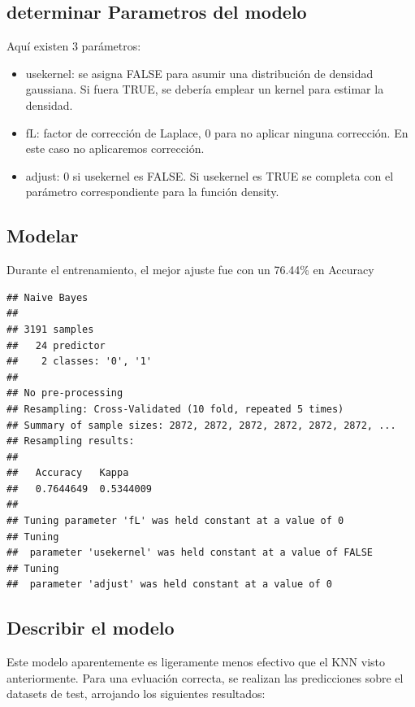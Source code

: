 \documentclass[]{article}
\begin{document}
\hypertarget{determinar-parametros-del-modelo}{%
\subsection{determinar Parametros del
modelo}\label{determinar-parametros-del-modelo}}

Aquí existen 3 parámetros:

\begin{itemize}
\item
  usekernel: se asigna FALSE para asumir una distribución de densidad
  gaussiana. Si fuera TRUE, se debería emplear un kernel para estimar la
  densidad.
\item
  fL: factor de corrección de Laplace, 0 para no aplicar ninguna
  corrección. En este caso no aplicaremos corrección.
\item
  adjust: 0 si usekernel es FALSE. Si usekernel es TRUE se completa con
  el parámetro correspondiente para la función density.
\end{itemize}

\hypertarget{modelar-1}{%
\subsection{Modelar}\label{modelar-1}}

Durante el entrenamiento, el mejor ajuste fue con un 76.44\% en Accuracy

\begin{lstlisting}
## Naive Bayes 
## 
## 3191 samples
##   24 predictor
##    2 classes: '0', '1' 
## 
## No pre-processing
## Resampling: Cross-Validated (10 fold, repeated 5 times) 
## Summary of sample sizes: 2872, 2872, 2872, 2872, 2872, 2872, ... 
## Resampling results:
## 
##   Accuracy   Kappa    
##   0.7644649  0.5344009
## 
## Tuning parameter 'fL' was held constant at a value of 0
## Tuning
##  parameter 'usekernel' was held constant at a value of FALSE
## Tuning
##  parameter 'adjust' was held constant at a value of 0
\end{lstlisting}

\hypertarget{describir-el-modelo-1}{%
\subsection{Describir el modelo}\label{describir-el-modelo-1}}

Este modelo aparentemente es ligeramente menos efectivo que el KNN visto
anteriormente. Para una evluación correcta, se realizan las predicciones
sobre el datasets de test, arrojando los siguientes resultados:
\end{document}
